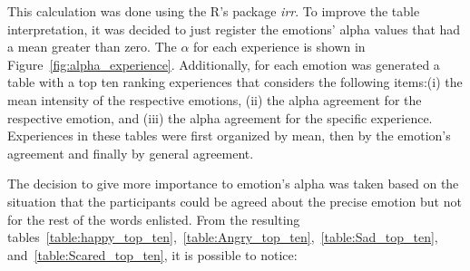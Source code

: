 This calculation was done using the R's package \textit{irr}. To improve the table interpretation, it was decided to just register the emotions' alpha values that had a mean greater than zero. The $\alpha$ for each experience is shown in Figure~\ref{fig:alpha_experience}. Additionally, for each emotion was generated a table with a top ten ranking experiences that considers the following items:(i) the mean intensity of the respective emotions, (ii) the alpha agreement for the respective emotion, and (iii) the alpha agreement for the specific experience. Experiences in these tables were first organized by mean, then by the emotion's agreement and finally by general agreement. %

The decision to give more importance to emotion's alpha was taken based on the situation that the participants could be agreed about the precise emotion but not for the rest of the words enlisted. %
From the resulting tables~\ref{table:happy_top_ten},~\ref{table:Angry_top_ten},~\ref{table:Sad_top_ten}, and~\ref{table:Scared_top_ten}, it is possible to notice:

